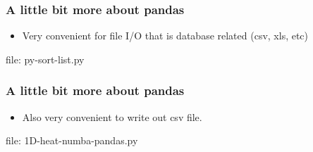 \begin{frame}[fragile]
\frametitle{A little bit more about pandas}

\begin{itemize}
\item Very convenient for file I/O that is database related (csv, xls, etc)
\end{itemize}

\newcommand{\newfilename}{py-sort-list.py}

file: \newfilename

\end{frame}


\begin{frame}[fragile]
\frametitle{A little bit more about pandas}

\begin{itemize}
\item Also very convenient to write out csv file.
\end{itemize}

\newcommand{\newfilename}{1D-heat-numba-pandas.py}

file: \newfilename

\end{frame}